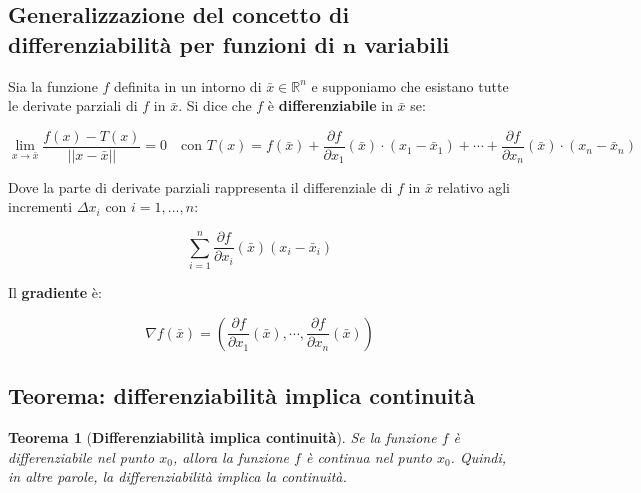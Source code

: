 \documentclass[a4paper]{article}
\newtheorem{theorem}{Teorema}
\begin{document}
	\newpage
	
	\subsection{Generalizzazione del concetto di differenziabilità per funzioni di $\boldsymbol{n}$ variabili}
	
	Sia la funzione $f$ definita in un intorno di $\bar{x} \in \mathbb{R}^{n}$ e supponiamo che esistano tutte le derivate parziali di $f$ in $\bar{x}$. Si dice che $f$ è \textbf{differenziabile} in $\bar{x}$ se:
	
	\begin{equation*}
		\lim_{x \rightarrow \bar{x}} \dfrac{f\left(x\right) - T\left(x\right)}{\Big||x-\bar{x}|\Big|} = 0 \hspace{1em} \text{con } T\left(x\right) = f\left(\bar{x}\right) + \dfrac{\partial f}{\partial x_{1}}\left(\bar{x}\right) \cdot \left(x_{1} - \bar{x}_{1}\right) + \cdots + \dfrac{\partial f}{\partial x_{n}}\left(\bar{x}\right) \cdot \left(x_{n} - \bar{x}_{n}\right)
	\end{equation*}

	\noindent
	Dove la parte di derivate parziali rappresenta il differenziale di $f$ in $\bar{x}$ relativo agli incrementi $\Delta x_{i}$ con $i = 1, ..., n$:
	
	\begin{equation*}
		\sum_{i = 1}^{n} \dfrac{\partial f}{\partial x_{i}}\left(\bar{x}\right)\left(x_{i} - \bar{x}_{i}\right)
	\end{equation*}

	\noindent
	Il \textbf{gradiente} è:
	
	\begin{equation*}
		\nabla f\left(\bar{x}\right) = \left(\dfrac{\partial f}{\partial x_{1}}\left(\bar{x}\right), \cdots, \dfrac{\partial f}{\partial x_{n}}\left(\bar{x}\right)\right)
	\end{equation*}

	\subsection[Teorema: differenziabilità implica continuità]{\textcolor{Red3}{Teorema: differenziabilità implica continuità}}
	
	\begin{theorem}[\textbf{Differenziabilità implica continuità}]\label{teorema: differenziabilità implica continuità}
		Se la funzione $f$ è differenziabile nel punto $x_{0}$, allora la funzione $f$ è continua nel punto $x_{0}$. Quindi, in altre parole, la differenziabilità implica la continuità.
	\end{theorem}
\end{document}
